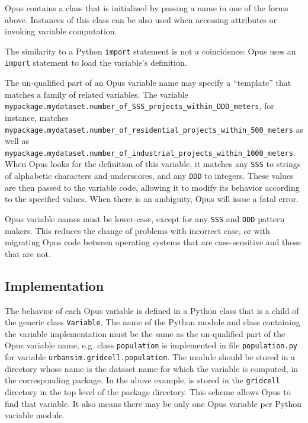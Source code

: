 Opus contains a class  that is initialized by passing a
name in one of the forms above. Instances of this class can be also used when
accessing attributes or invoking variable computation.

The similarity to a Python \verb|import| statement is not a
coincidence: Opus uses an \verb|import| statement to load the variable's
 definition.

The un-qualified part of an Opus variable name may specify
a ``template'' that matches a family of related variables.
The variable
\verb|mypackage.mydataset.number_of_SSS_projects_within_DDD_meters|, for
instance, matches
\verb|mypackage.mydataset.number_of_residential_projects_within_500_meters|
as well as
\verb|mypackage.mydataset.number_of_industrial_projects_within_1000_meters|.
When Opus looks for the definition of this variable, it
matches any \verb|SSS| to strings of alphabetic characters and underscores,
and any \verb|DDD| to integers. These values are then passed to the
variable code, allowing it to modify its behavior according
to the specified values. When there is an ambiguity, Opus will issue a
fatal error.

Opus variable names must be lower-case, except for any
\verb|SSS| and \verb|DDD| pattern makers.  This reduces the change of
problems with incorrect case, or with migrating Opus code between operating
systems that are case-sensitive and those that are not.

\subsection{Implementation}
\label{sec:variable-implementation}
%
The behavior of each Opus variable is defined in a Python class that is a
child of the generic class \verb|Variable|. The name of the Python module and
class containing the variable implementation must be the same as the
un-qualified part of the Opus variable name, e.g. class \verb|population| is
implemented in file \verb|population.py| for variable
\verb|urbansim.gridcell.population|. The module should be stored in a
directory whose name is the dataset name for which the variable is computed,
in the corresponding package. In the above example,  is
stored in the \verb|gridcell| directory in the top level of the
 package directory.  This scheme allows Opus to find that
variable.  It also means there may be only one Opus variable per Python
variable module.

